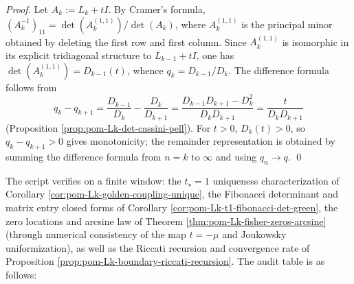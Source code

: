 \begin{proof}
Let \(A_k:=L_k+tI\).
By Cramer's formula,
\(
(A_k^{-1})_{11}=\det(A_k^{(1,1)})/\det(A_k)
\), where \(A_k^{(1,1)}\) is the principal minor obtained by deleting the first row and first column.
Since \(A_k^{(1,1)}\) is isomorphic in its explicit tridiagonal structure to \(L_{k-1}+tI\), one has \(\det(A_k^{(1,1)})=D_{k-1}(t)\), whence \(q_k=D_{k-1}/D_k\).
The difference formula follows from
\[
q_k-q_{k+1}
=\frac{D_{k-1}}{D_k}-\frac{D_k}{D_{k+1}}
=\frac{D_{k-1}D_{k+1}-D_k^2}{D_kD_{k+1}}
=\frac{t}{D_kD_{k+1}}
\]
(Proposition \ref{prop:pom-Lk-det-cassini-pell}).
For \(t>0\), \(D_k(t)>0\), so \(q_k-q_{k+1}>0\) gives monotonicity; the remainder representation is obtained by summing the difference formula from \(n=k\) to \(\infty\) and using \(q_n\to q\). \qed
\end{proof}
\begin{remark}\label{rem:pom-fence-green-kernel-golden-coupling-audit}
The script verifies on a finite window: the \(t_\star=1\) uniqueness characterization of Corollary \ref{cor:pom-Lk-golden-coupling-unique},
the Fibonacci determinant and matrix entry closed forms of Corollary \ref{cor:pom-Lk-t1-fibonacci-det-green},
the zero locations and arcsine law of Theorem \ref{thm:pom-Lk-fisher-zeros-arcsine} (through numerical consistency of the map \(t=-\mu\) and Joukowsky uniformization),
as well as the Riccati recursion and convergence rate of Proposition \ref{prop:pom-Lk-boundary-riccati-recursion}.
The audit table is as follows:

\end{remark}


